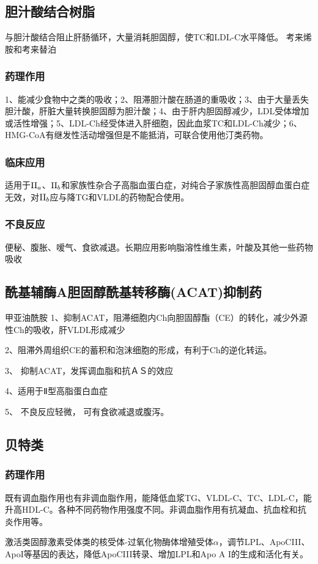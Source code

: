 \documentclass[UTF8]{ctexbook}
\begin{document}
\subsection{胆汁酸结合树脂}与胆汁酸结合阻止肝肠循环，大量消耗胆固醇，使TC和LDL-C水平降低。
考来烯胺和考来替泊
\subsubsection{药理作用}
1、能减少食物中之类的吸收；2、阻滞胆汁酸在肠道的重吸收；3、由于大量丢失胆汁酸，肝脏大量转换胆固醇为胆汁酸；4、由于肝内胆固醇减少，LDL受体增加或活性增强；5、LDL-Ch经受体进入肝细胞，因此血浆TC和LDL-Ch减少；6、HMG-CoA有继发性活动增强但是不能抵消，可联合使用他汀类药物。
\subsubsection{临床应用}
适用于\(\textup{II}_{a}\)、\(\textup{II}_{b}\)和家族性杂合子高脂血蛋白症，对纯合子家族性高胆固醇血蛋白症无效，对\(\textup{II}_{b}\)应与降TG和VLDL的药物配合使用。
\subsubsection{不良反应}
便秘、腹胀、嗳气、食欲减退。长期应用影响脂溶性维生素，叶酸及其他一些药物吸收
\subsection{酰基辅酶A胆固醇酰基转移酶(ACAT)抑制药}甲亚油酰胺
1、抑制ACAT，阻滞细胞内Ch向胆固醇酯（CE）的转化，减少外源性Ch的吸收，肝VLDL形成减少

2、阻滞外周组织CE的蓄积和泡沫细胞的形成，有利于Ch的逆化转运。

3、 抑制ACAT，发挥调血脂和抗ＡＳ的效应

4、适用于Ⅱ型高脂蛋白血症

5、 不良反应轻微， 可有食欲减退或腹泻。
\subsection{贝特类}
\subsubsection{药理作用}
既有调血脂作用也有非调血脂作用，能降低血浆TG、VLDL-C、TC、LDL-C，能升高HDL-C。各种不同药物作用强度不同。非调血脂作用有抗凝血、抗血栓和抗炎作用等。

激活类固醇激素受体类的核受体-过氧化物酶体增殖受体\(\alpha\)，调节LPL、ApoCIII、ApoI等基因的表达，降低ApoCIII转录、增加LPL和Apo A I的生成和活化有关。
\end{document}
